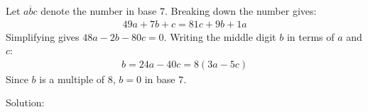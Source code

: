 Let $\overline{abc}$ denote the number in base $7$. 
Breaking down the number gives:
\begin{align*}
49a + 7b + c = 81c + 9b + 1a
\end{align*}
Simplifying gives $48a-2b-80c=0$. Writing the middle digit $b$ in terms of $a$ and $c$:
\begin{align*}
b = 24a - 40c = 8 (3a - 5c)
\end{align*}
Since $b$ is a multiple of $8$, $b=0$ in base $7$.

Solution: 